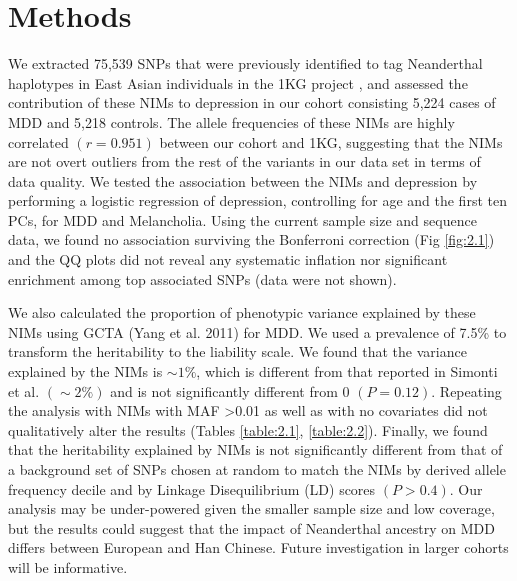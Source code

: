 \section{Methods}
We extracted 75,539 SNPs that were previously identified to tag Neanderthal haplotypes in East Asian individuals in the 1KG project \cite{sankararaman2014genomic}, and assessed the contribution of these NIMs to depression in our cohort consisting 5,224 cases of MDD and 5,218 controls. The allele frequencies of these NIMs are highly correlated $(r=0.951)$ between our cohort and 1KG, suggesting that the NIMs are not overt outliers from the rest of the variants in our data set in terms of data quality. We tested the association between the NIMs and depression by performing a logistic regression of depression, controlling for age and the first ten PCs, for MDD and Melancholia. Using the current sample size and sequence data, we found no association surviving the Bonferroni correction (Fig \ref{fig:2.1}) and the QQ plots did not reveal any systematic inflation nor significant enrichment among top associated SNPs (data were not shown).

We also calculated the proportion of phenotypic variance explained by these NIMs using GCTA (Yang et al. 2011) for MDD. We used a prevalence of 7.5\% to transform the heritability to the liability scale. We found that the variance explained by the NIMs is $\sim1\%$, which is different from that reported in Simonti et al. $(\sim2\%)$ and is not significantly different from 0 $(P=0.12)$. Repeating the analysis with NIMs with MAF >0.01 as well as with no covariates did not qualitatively alter the results (Tables \ref{table:2.1}, \ref{table:2.2}). Finally, we found that the heritability explained by NIMs is not significantly different from that of a background set of SNPs chosen at random to match the NIMs by derived allele frequency decile and by Linkage Disequilibrium (LD) scores $(P>0.4)$. Our analysis may be under-powered given the smaller sample size and low coverage, but the results could suggest that the impact of Neanderthal ancestry on MDD differs between European and Han Chinese. Future investigation in larger cohorts will be informative.
